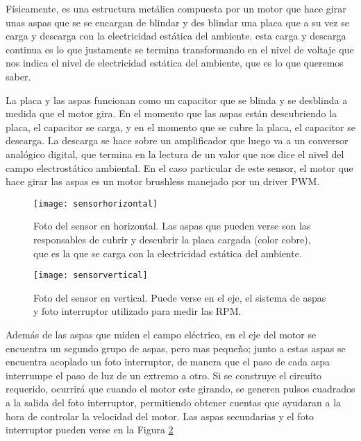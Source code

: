 Físicamente, es una estructura metálica compuesta por un motor que hace girar unas aspas que se se encargan de blindar y des blindar una placa que a su vez se carga y descarga con la electricidad estática del ambiente. esta carga y descarga continua es lo que justamente se termina transformando en el nivel de voltaje que nos indica el nivel de electricidad estática del ambiente, que es lo que queremos saber.

La placa y las aspas funcionan como un capacitor que se blinda y se des\-blinda a medida que el motor gira. En el momento que las aspas están descubriendo la placa, el capacitor se carga, y en el momento que se cubre la placa, el capacitor se descarga. La descarga se hace sobre un amplificador que luego va a un conversor analógico digital, que termina en la lectura de un valor que nos dice el nivel del campo electrostático ambiental. En el caso particular de este sensor, el motor que hace girar las aspas es un motor brushless manejado por un driver PWM.

\begin{figure}[h]
  \centering
  \texttt{[image: sensorhorizontal]}
  \caption[Imagen del sensor de campo electrostático utilizado (horizontal)]{Foto del sensor en horizontal. Las aspas que pueden verse son las responsables de cubrir y descubrir la placa cargada (color cobre), que es la que se carga con la electricidad estática del ambiente.}\label{fig:sensorhorizontal}
\end{figure}

\begin{figure}[h]
  \centering
  \texttt{[image: sensorvertical]}
  \caption[Imagen del sensor de campo electrostático utilizado (vertical)]{Foto del sensor en vertical. Puede verse en el eje, el sistema de aspas y foto interruptor utilizado para medir las RPM.}\label{fig:sensorvertical}
\end{figure}

Además de las aspas que miden el campo eléctrico, en el eje del motor se encuentra un segundo grupo de aspas, pero mas pequeño; junto a estas aspas se encuentra acoplado un foto interruptor, de manera que el paso de cada aspa interrumpe el paso de luz de un extremo a otro. Si se construye el circuito requerido, ocurrirá que cuando el motor este girando, se generen pulsos cuadrados a la salida del foto interruptor, permitiendo obtener cuentas que ayudaran a la hora de controlar la velocidad del motor. Las aspas secundarias y el foto interruptor pueden verse en la Figura \ref{fig:sensorvertical}

